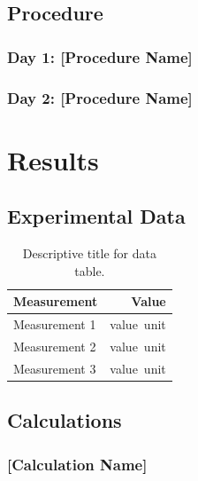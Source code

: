 \documentclass[
	10pt,
	twocolumn,
	letterpaper,
]{article}
\begin{document}
\subsection{Procedure}

\subsubsection{Day 1: [Procedure Name]}


\subsubsection{Day 2: [Procedure Name]}


\section{Results}

\subsection{Experimental Data}

\begin{table}[htbp]
	\centering
	\caption{Descriptive title for data table.}
	\label{tab:data}
	\begin{tabular}{@{}lr@{}}
		\toprule
		\textbf{Measurement} & \textbf{Value} \\
		\midrule
		Measurement 1 & \SI{value}{unit} \\
		Measurement 2 & \SI{value}{unit} \\
		Measurement 3 & \SI{value}{unit} \\
		\bottomrule
	\end{tabular}
\end{table}

\subsection{Calculations}

\subsubsection{[Calculation Name]}

\end{document}

